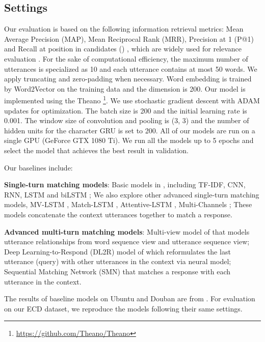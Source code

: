 \documentclass[11pt]{article}
\begin{document}
\subsection{Settings}

Our evaluation is based on the following information retrieval metrics: Mean Average Precision (MAP), Mean Reciprocal Rank (MRR), Precision at 1 (P@1) and  Recall at position  in  candidates () , which are widely used for relevance evaluation \cite{Wu2016Sequential,Lowe2015The}. For the sake of computational efficiency, the maximum number of utterances is specialized as 10 and each utterance contains at most 50 words. We apply truncating and zero-padding when necessary. Word embedding is trained by Word2Vector \cite{mikolov:2013} on the training data and the dimension is 200. Our model is implemented using the Theano \footnote{\url{https://github.com/Theano/Theano}}. We use stochastic gradient descent with ADAM \cite{Kingma2014Adam} updates for optimization. The batch size is 200 and the initial learning rate is 0.001. The window size of convolution and pooling is (3, 3) and the number of hidden units for the character GRU is set to 200. All of our models are run on a single GPU (GeForce GTX 1080 Ti). We run all the models up to 5 epochs and select the model that achieves the best result in validation. 

Our baselines include:

 \textbf{Single-turn matching models}: Basic models in \cite{Kadlec2015Improved,Lowe2015The}, including TF-IDF, CNN, RNN, LSTM and biLSTM ; We also explore other advanced single-turn matching models, MV-LSTM \cite{Wan2016Match}, Match-LSTM \cite{Wang2015Learning},
Attentive-LSTM \cite{Tan2015LSTM}, Multi-Channels \cite{Wu2016Sequential}; These models concatenate the context utterances together to match a response.

 \textbf{Advanced multi-turn matching models}:
Multi-view model of \cite{Zhou2016Multi} that models utterance relationships from word sequence view and utterance sequence view; Deep Learning-to-Respond (DL2R) model of \cite{yan2016Learning} which reformulates the last utterance (query) with other utterances in the context via neural model; Sequential Matching Network (SMN) \cite{Wu2016Sequential} that matches a response with each utterance in the context.

The results of baseline models on Ubuntu and Douban are from \cite{Wu2016Sequential}. For evaluation on our ECD dataset, we reproduce the models following their same settings.
\end{document}
